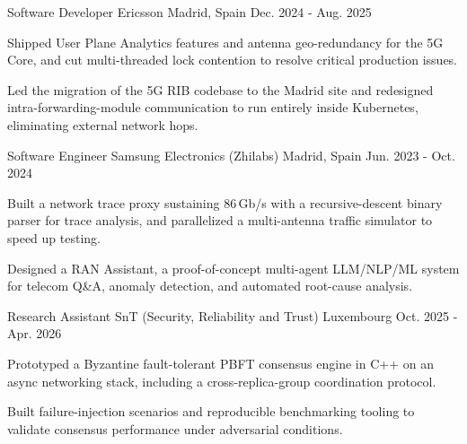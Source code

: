 \documentclass[11pt, a4paper]{cv}
\begin{document}
\begin{cventries}
  \cventry
    {Software Developer} %
    {Ericsson} %
    {Madrid, Spain} %
    {Dec. 2024 - Aug. 2025} %
    {
      \begin{cvitems}
        \item {Shipped User Plane Analytics features and antenna geo-redundancy for the 5G Core, and cut multi-threaded lock contention to resolve critical production issues.}
        \item {Led the migration of the 5G RIB codebase to the Madrid site and redesigned intra-forwarding-module communication to run entirely inside Kubernetes, eliminating external network hops.}
      \end{cvitems}
    }

  \cventry
    {Software Engineer} %
    {Samsung Electronics (Zhilabs)} %
    {Madrid, Spain} %
    {Jun. 2023 - Oct. 2024} %
    {
      \begin{cvitems}
        \item {Built a network trace proxy sustaining 86\,Gb/s with a recursive-descent binary parser for trace analysis, and parallelized a multi-antenna traffic simulator to speed up testing.}
        \item {Designed a RAN Assistant, a proof-of-concept multi-agent LLM/NLP/ML system for telecom Q\&A, anomaly detection, and automated root-cause analysis.}
      \end{cvitems}
    }
\end{cventries}

\begin{cventries}
  \cventry
    {Research Assistant}
    {SnT (Security, Reliability and Trust)}
    {Luxembourg}
    {Oct. 2025 - Apr. 2026}
    {
      \begin{cvitems}
        \item {Prototyped a Byzantine fault-tolerant PBFT consensus engine in C++ on an async networking stack, including a cross-replica-group coordination protocol.}
        \item {Built failure-injection scenarios and reproducible benchmarking tooling to validate consensus performance under adversarial conditions.}
      \end{cvitems}
    }
\end{cventries}
\end{document}
